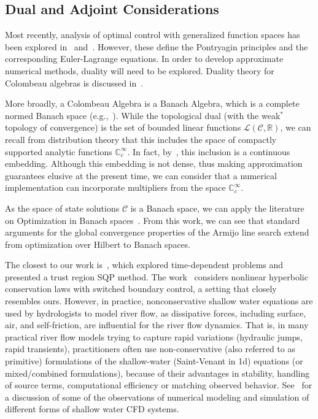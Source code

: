 \documentclass{article}
\newcommand{\1}{\mathds{1}}          %
\theoremstyle{definition}
\begin{document}
\begin{sloppypar}
\subsection{Dual and Adjoint Considerations}

Most recently, analysis of optimal control with generalized function spaces has been explored in~\cite{konjik2008foundations} and~\cite{frederico2022calculus}. However, these define the Pontryagin principles and the corresponding Euler-Lagrange equations. In order to develop approximate numerical methods, duality will need to be explored. Duality theory for Colombeau algebras is discussed in~\cite{garetto2005topological}. 

More broadly, a Colombeau Algebra is a Banach Algebra, which is a complete normed Banach space (e.g.,~\cite{soleimani2009optimality}). While the topological dual (with the weak$^*$ topology of convergence) is the set of bounded linear functions $\mathcal{L}(\mathcal{C},\mathbb{R})$, we can recall from distribution theory that this includes the space of compactly supported analytic functions $\mathbb{C}^{\infty}_c$. In fact, by~\cite{garetto2005topological}, this inclusion is a continuous embedding. Although this embedding is not dense, thus making approximation guarantees elusive at the present time, we can consider that a numerical implementation can incorporate multipliers from the space $\mathbb{C}^{\infty}_c$. 

As the space of state solutions $\mathcal{C}$ is a Banach space, we can apply the literature on Optimization in Banach spaces~\cite{hinze2009optimization}.  From this work, we can see that standard arguments for the global convergence properties of the Armijo line search extend from optimization over Hilbert to Banach spaces. 

The closest to our work is~\cite{ulbrich2007generalized}, which explored time-dependent problems and presented a trust region SQP method. The work~\cite{pfaff2015optimal} considers nonlinear hyperbolic conservation laws with switched boundary control, a setting that closely resembles ours. However, in practice, nonconservative shallow water equations are used by hydrologists to model river flow, as dissipative forces, including surface, air, and self-friction, are influential for the river flow dynamics. That is, in many practical river flow models trying to capture rapid variations (hydraulic jumps, rapid transients), practitioners often use non-conservative (also referred to as primitive) formulations of the shallow-water (Saint-Venant in 1d) equations (or mixed/combined formulations), because of their advantages in stability, handling of source terms, computational efficiency or matching observed behavior. See~\cite{abgrall2023new,pudjaprasetya2014momentum,wei2013depth} for a discussion of some of the observations of numerical modeling and simulation of different forms of shallow water CFD systems. 



\end{sloppypar}
\end{document}
